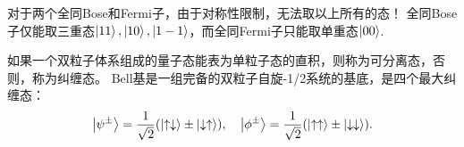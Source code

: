 对于两个全同Bose和Fermi子，由于对称性限制，无法取以上所有的态！
全同Bose子仅能取三重态$\ket{11}, \ket{10}, \ket{1-1}$，而全同Fermi子只能取单重态$\ket{00}$.

如果一个双粒子体系组成的量子态能表为单粒子态的直积，则称为可分离态，否则，称为纠缠态。
Bell基是一组完备的双粒子自旋-1/2系统的基底，是四个最大纠缠态：
\begin{equation}
    \ket{\psi^{\pm}}=\frac{1}{\sqrt{2}}(\ket{\uparrow\downarrow}\pm\ket{\downarrow\uparrow}),\quad
    \ket{\phi^{\pm}}=\frac{1}{\sqrt{2}}(\ket{\uparrow\uparrow}\pm\ket{\downarrow\downarrow}).
\end{equation}
